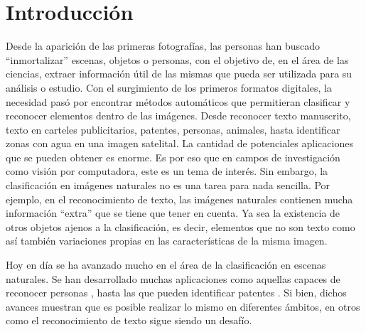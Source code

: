 \newpage
\section{Introducción}

	Desde la aparición de las primeras fotografías, las personas han buscado ``inmortalizar'' escenas, objetos o personas, con el objetivo de, en el área de las ciencias, extraer información útil de las mismas que pueda ser utilizada para su análisis o estudio. Con el surgimiento de los primeros formatos digitales, la necesidad pasó por encontrar métodos automáticos que permitieran clasificar y reconocer elementos dentro de las imágenes. Desde reconocer texto manuscrito, texto en carteles publicitarios, patentes, personas, animales, hasta identificar zonas con agua en una imagen satelital. La cantidad de potenciales aplicaciones que se pueden obtener es enorme. Es por eso que en campos de investigación como visión por computadora, este es un tema de interés. Sin embargo, la clasificación en imágenes naturales no es una tarea para nada sencilla. Por ejemplo, en el reconocimiento de texto, las imágenes naturales contienen mucha información ``extra'' que se tiene que tener en cuenta. Ya sea la existencia de otros objetos ajenos a la clasificación, es decir, elementos que no son texto como así también variaciones propias en las características de la misma imagen.
	
	Hoy en día se ha avanzado mucho en el área de la clasificación en escenas naturales. Se han desarrollado muchas aplicaciones como aquellas capaces de reconocer personas \cite{DT05}, hasta las que pueden identificar patentes \cite{DAB}. Si bien, dichos avances muestran que es posible realizar lo mismo en diferentes ámbitos, en otros como el reconocimiento de texto sigue siendo un desafío.
	
	
	
	

	
	
	
	
	

